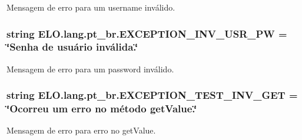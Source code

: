 Mensagem de erro para um username inválido. 

\hypertarget{namespaceELO_1_1lang_1_1pt__br_a65a3090ed44928d83e54554e85a00417}{
\subsubsection[{E\-X\-C\-E\-P\-T\-I\-O\-N\-\_\-\-I\-N\-V\-\_\-\-U\-S\-R\-\_\-\-P\-W}]{\setlength{\rightskip}{0pt plus 5cm}string E\-L\-O.\-lang.\-pt\-\_\-br.\-E\-X\-C\-E\-P\-T\-I\-O\-N\-\_\-\-I\-N\-V\-\_\-\-U\-S\-R\-\_\-\-P\-W = \char`\"{}Senha de usuário inválida.\char`\"{}}}\label{d5/d70/namespaceELO_1_1lang_1_1pt__br_a65a3090ed44928d83e54554e85a00417}


Mensagem de erro para um password inválido. 

\hypertarget{namespaceELO_1_1lang_1_1pt__br_a3bb3602f4ced69134607abfe16e93d5d}{
\subsubsection[{E\-X\-C\-E\-P\-T\-I\-O\-N\-\_\-\-T\-E\-S\-T\-\_\-\-I\-N\-V\-\_\-\-G\-E\-T}]{\setlength{\rightskip}{0pt plus 5cm}string E\-L\-O.\-lang.\-pt\-\_\-br.\-E\-X\-C\-E\-P\-T\-I\-O\-N\-\_\-\-T\-E\-S\-T\-\_\-\-I\-N\-V\-\_\-\-G\-E\-T = \char`\"{}Ocorreu um erro no método get\-Value.\char`\"{}}}\label{d5/d70/namespaceELO_1_1lang_1_1pt__br_a3bb3602f4ced69134607abfe16e93d5d}


Mensagem de erro para erro no get\-Value. 

